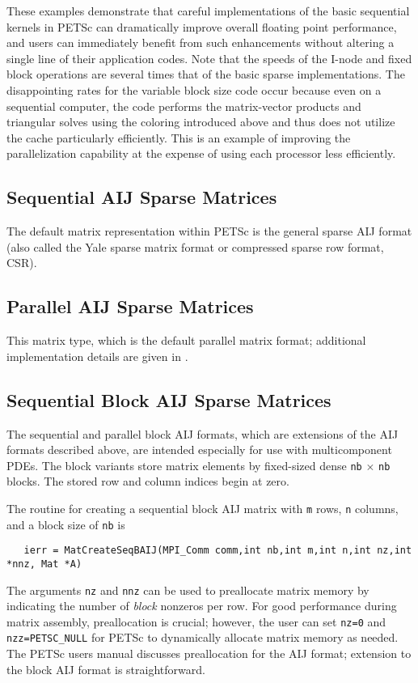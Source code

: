 These examples demonstrate that careful implementations of the basic
sequential kernels in PETSc can dramatically improve overall floating
point performance, and users can immediately benefit from such
enhancements without altering a single line of their application
codes.  Note that the speeds of the I-node and fixed block operations
are several times that of the basic sparse implementations.  The
disappointing rates for the variable block size code occur because
even on a sequential computer, the code performs the matrix-vector
products and triangular solves using the coloring introduced above and
thus does not utilize the cache particularly efficiently.  This is an
example of improving the parallelization capability at the expense of
using each processor less efficiently.

\subsection{Sequential AIJ Sparse Matrices}

The default matrix representation within PETSc is the general sparse
AIJ format (also called the Yale sparse matrix format or compressed
sparse row format, CSR).

\subsection{Parallel AIJ Sparse Matrices}

This matrix type, which is the
default parallel matrix format; additional implementation details are
given in \cite{efficient}.

\subsection{Sequential Block AIJ Sparse Matrices}

The sequential and parallel block AIJ formats, which are extensions of
the AIJ formats described above, are intended especially for use with
multicomponent PDEs.  The block variants store matrix elements by
fixed-sized dense {\tt nb} $\times$ {\tt nb} blocks.  The stored row
and column indices begin at zero.

The routine for creating a sequential block AIJ matrix with {\tt m} 
rows, {\tt n} columns, and a block size of {\tt nb} is
\begin{verbatim}
   ierr = MatCreateSeqBAIJ(MPI_Comm comm,int nb,int m,int n,int nz,int *nnz, Mat *A)
\end{verbatim}
The arguments {\tt nz} and {\tt nnz} can be used to preallocate matrix
memory by indicating the number of {\em block} nonzeros per row.  For good
performance during matrix assembly, preallocation is crucial; however, the
user can set {\tt nz=0} and {\tt nzz=PETSC\_NULL} for PETSc to dynamically
allocate matrix memory as needed.  The PETSc users manual 
discusses preallocation for the AIJ format; extension to the block AIJ
format is straightforward.

